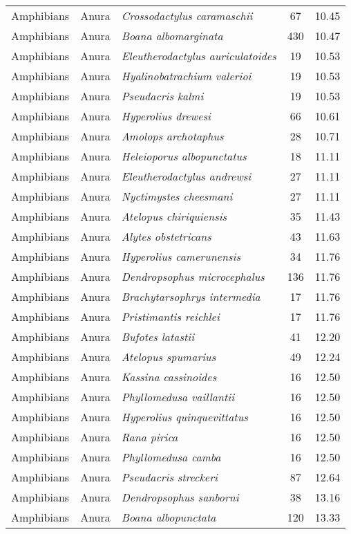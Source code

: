 \begin{longtable}{ll>{\itshape}lcc}
  Amphibians & Anura & Crossodactylus caramaschii &  67 & 10.45 \\ 
  Amphibians & Anura & Boana albomarginata & 430 & 10.47 \\ 
  Amphibians & Anura & Eleutherodactylus auriculatoides &  19 & 10.53 \\ 
  Amphibians & Anura & Hyalinobatrachium valerioi &  19 & 10.53 \\ 
  Amphibians & Anura & Pseudacris kalmi &  19 & 10.53 \\ 
  Amphibians & Anura & Hyperolius drewesi &  66 & 10.61 \\ 
  Amphibians & Anura & Amolops archotaphus &  28 & 10.71 \\ 
  Amphibians & Anura & Heleioporus albopunctatus &  18 & 11.11 \\ 
  Amphibians & Anura & Eleutherodactylus andrewsi &  27 & 11.11 \\ 
  Amphibians & Anura & Nyctimystes cheesmani &  27 & 11.11 \\ 
  Amphibians & Anura & Atelopus chiriquiensis &  35 & 11.43 \\ 
  Amphibians & Anura & Alytes obstetricans &  43 & 11.63 \\ 
  Amphibians & Anura & Hyperolius camerunensis &  34 & 11.76 \\ 
  Amphibians & Anura & Dendropsophus microcephalus & 136 & 11.76 \\ 
  Amphibians & Anura & Brachytarsophrys intermedia &  17 & 11.76 \\ 
  Amphibians & Anura & Pristimantis reichlei &  17 & 11.76 \\ 
  Amphibians & Anura & Bufotes latastii &  41 & 12.20 \\ 
  Amphibians & Anura & Atelopus spumarius &  49 & 12.24 \\ 
  Amphibians & Anura & Kassina cassinoides &  16 & 12.50 \\ 
  Amphibians & Anura & Phyllomedusa vaillantii &  16 & 12.50 \\ 
  Amphibians & Anura & Hyperolius quinquevittatus &  16 & 12.50 \\ 
  Amphibians & Anura & Rana pirica &  16 & 12.50 \\ 
  Amphibians & Anura & Phyllomedusa camba &  16 & 12.50 \\ 
  Amphibians & Anura & Pseudacris streckeri &  87 & 12.64 \\ 
  Amphibians & Anura & Dendropsophus sanborni &  38 & 13.16 \\ 
  Amphibians & Anura & Boana albopunctata & 120 & 13.33 \\ 

\end{longtable}
